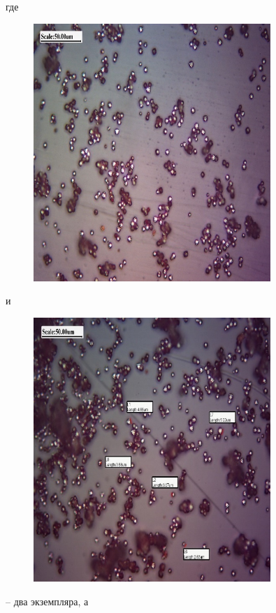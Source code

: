 где \begin{figure}[H]
	\centering
	\includegraphics[width=0.8\textwidth]{assets/17}
	\caption*{}
\end{figure} и
\begin{figure}[H]
	\centering
	\includegraphics[width=0.8\textwidth]{assets/18}
	\caption*{}
\end{figure} -- два экземпляра, а
